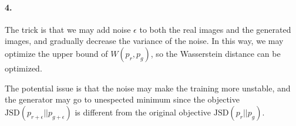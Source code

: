\documentclass[a4 paper,12pt]{article}
\begin{document}
\paragraph*{4.} The trick is that we may add noise $\epsilon$ to both the real images and the generated images, and gradually decrease the variance of the noise. In this way, we may optimize the upper bound of $W(p_r,p_g)$, so the Wasserstein distance can be optimized. 

The potential issue is that the noise may make the training more unstable, and the generator may go to unespected minimum since the objective $\text{JSD}(p_{r+\epsilon}||p_{g+\epsilon})$ is different from the original objective $\text{JSD}(p_{r}||p_g)$.


\end{document}
